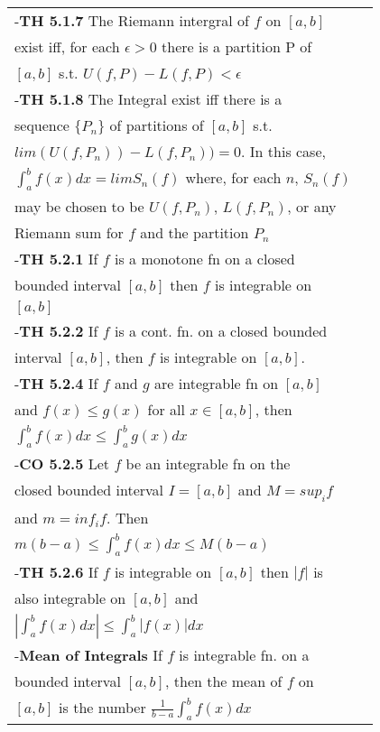 \documentclass[10 pt,landscape]{article}
\begin{document}
\begin{multicols}{4}
\begin{tabular}{@{}ll@{}}


-\textbf{TH 5.1.7} The Riemann intergral of $f$ on $[a,b]$\\ exist iff, for each $\epsilon >0$ there is a partition P of \\ $[a,b]$ s.t. $U(f,P)-L(f,P)< \epsilon $\\
-\textbf{TH 5.1.8} The Integral exist iff there is a\\ sequence $\{P_n\}$ of partitions of $[a,b]$ s.t.\\ $lim(U(f,P_n))-L(f,P_n))=0$. In this case,\\
$\int_{a}^{b}f(x)dx=limS_n(f)$ where, for each $n$, $S_n(f)$\\ may be chosen to be $U(f,P_n)$, $L(f,P_n)$, or any \\Riemann sum for $f$ and the partition $P_n$\\
-\textbf{TH 5.2.1} If $f$ is a monotone fn on a closed\\ bounded interval $[a,b]$ then $f$ is integrable on\\ $[a,b]$\\
-\textbf{TH 5.2.2} If $f$ is a cont. fn. on a closed bounded \\interval $[a,b]$, then $f$ is integrable on $[a,b]$. \\
-\textbf{TH 5.2.4} If $f$ and $g$ are integrable fn on $[a,b]$\\ and $f(x) \leq g(x)$ for all $x \in [a,b]$, then\\ $\int_{a}^{b}f(x)dx \leq \int_{a}^{b}g(x)dx$\\
-\textbf{CO 5.2.5} Let $f$ be an integrable fn on the \\ closed bounded interval $I=[a,b]$ and $M=sup_i f$\\ and $m=inf_i f$. Then \\$m(b-a) \leq \int_{a}^{b}f(x)dx \leq M(b-a)$\\
-\textbf{TH 5.2.6} If $f$ is integrable on $[a,b]$ then $|f|$ is \\ also integrable on $[a,b]$ and \\
$|\int_{a}^{b}f(x)dx| \leq \int_{a}^{b}|f(x)|dx$\\
-\textbf{Mean of Integrals} If $f$ is integrable fn. on a \\ bounded interval $[a,b]$, then the mean of $f$ on \\$[a,b]$ is the number $\frac{1}{b-a}\int_{a}^{b}f(x)dx$\\


\end{tabular}
\end{multicols}
\end{document}
